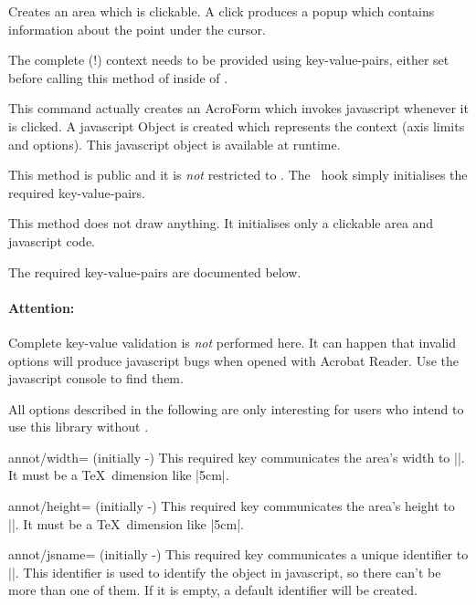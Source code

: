 \begin{command}{\pgfplotsclickablecreate{}}
	Creates an area which is clickable. A click produces a popup which
	contains information about the point under the cursor.
	
	The complete (!) context needs to be provided using key-value-pairs, either set before
	calling this method of inside of .
	
	This command actually creates an AcroForm which invokes javascript
	whenever it is clicked. A javascript Object is created which
	represents the context (axis limits and options). This javascript
	object is available at runtime.
	
	This method is public and it is \emph{not} restricted to \PGFPlots.
	The \PGFPlots\ hook simply initialises the required key-value-pairs.

	This method does not draw anything. It initialises only a
	clickable area and javascript code.
	
	The required key-value-pairs are documented below.
	
	\paragraph{Attention:} Complete key-value validation is \emph{not} performed here. It
	can happen that invalid options will produce javascript bugs when
	opened with Acrobat Reader. Use the javascript console to find them.
\end{command}

\noindent All options described in the following are only interesting for users who intend to use this library without \PGFPlots.

\begin{pgfplotskey}{annot/width= (initially -)}
	This required key communicates the area's width to |\pgfplotsclickablecreate|. It must be a \TeX\ dimension like |5cm|.
\end{pgfplotskey}
\begin{pgfplotskey}{annot/height= (initially -)}
	This required key communicates the area's height to |\pgfplotsclickablecreate|. It must be a \TeX\ dimension like |5cm|.
\end{pgfplotskey}
\begin{pgfplotskey}{annot/jsname= (initially -)}
	This required key communicates a unique identifier to |\pgfplotsclickablecreate|. This identifier is used to identify the object in javascript, so there can't be more than one of them. If it is empty, a default identifier will be created.
\end{pgfplotskey}


